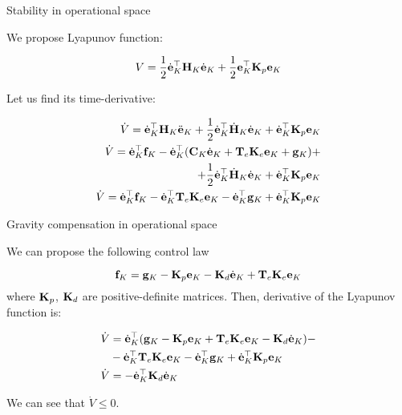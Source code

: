 \documentclass{beamer}
\begin{document}
\begin{frame}{Stability in operational space}
	\begin{flushleft}
		
	We propose Lyapunov function:
		 
\begin{equation}
	V = \frac{1}{2} \dot{\mathbf{e}}_K^\top  \mathbf{H}_K \dot{\mathbf{e}}_K + 
	       \frac{1}{2} \mathbf{e}_K^\top \mathbf{K}_p \mathbf{e}_K
\end{equation}		
		
		Let us find its time-derivative:
		
\begin{align*}
	\dot V = \dot{\mathbf{e}}_K^\top  \mathbf{H}_K \ddot{\mathbf{e}}_K + 
				  \frac{1}{2} \dot{\mathbf{e}}_K^\top  \dot{\mathbf{H}}_K \dot{\mathbf{e}}_K+
	               \dot{\mathbf{e}}_K^\top \mathbf{K}_p \mathbf{e}_K
	               \\
	\dot V = \dot{\mathbf{e}}_K^\top  \mathbf{f}_K - 
	\dot{\mathbf{e}}_K^\top (\mathbf{C}_K \dot{\mathbf{e}}_K +
	\mathbf{T}_e \mathbf{K}_e \mathbf{e}_K	+
	\mathbf{g} _K) + \\
	+\frac{1}{2} \dot{\mathbf{e}}_K^\top  \dot{\mathbf{H}}_K \dot{\mathbf{e}}_K +
	\dot{\mathbf{e}}_K^\top \mathbf{K}_p \mathbf{e}_K             
	\\
	\dot V = \dot{\mathbf{e}}_K^\top  \mathbf{f}_K  - 
	\dot{\mathbf{e}}_K^\top \mathbf{T}_e \mathbf{K}_e \mathbf{e}_K	
	- \dot{\mathbf{e}}_K^\top \mathbf{g} _K + 
	\dot{\mathbf{e}}_K^\top \mathbf{K}_p \mathbf{e}_K
\end{align*}				
		
		
	\end{flushleft}
\end{frame}



\begin{frame}{Gravity compensation in operational space}
	\begin{flushleft}
		
		We can propose the following control law
		
		\begin{equation}
			\mathbf{f}_K = \mathbf{g} _K - \mathbf{K}_p \mathbf{e}_K - \mathbf{K}_d \dot{\mathbf{e}}_K + \mathbf{T}_e \mathbf{K}_e \mathbf{e}_K
		\end{equation}
	where $\mathbf{K}_p$,  $\mathbf{K}_d$ are positive-definite matrices. Then, derivative of the Lyapunov function is:
		
	\begin{align*}
	\dot V &= \dot{\mathbf{e}}_K^\top  
	(\mathbf{g} _K - \mathbf{K}_p \mathbf{e}_K + \mathbf{T}_e \mathbf{K}_e \mathbf{e}_K	- \mathbf{K}_d \dot{\mathbf{e}}_K)  - \\
&-\dot{\mathbf{e}}_K^\top \mathbf{T}_e \mathbf{K}_e \mathbf{e}_K	
- \dot{\mathbf{e}}_K^\top \mathbf{g} _K + 
\dot{\mathbf{e}}_K^\top \mathbf{K}_p \mathbf{e}_K
\\
\dot V &= -\dot{\mathbf{e}}_K^\top \mathbf{K}_d \dot{\mathbf{e}}_K
	\end{align*}		
		
		We can see that $\dot V \leq 0$.
		
	\end{flushleft}
\end{frame}
\end{document}
